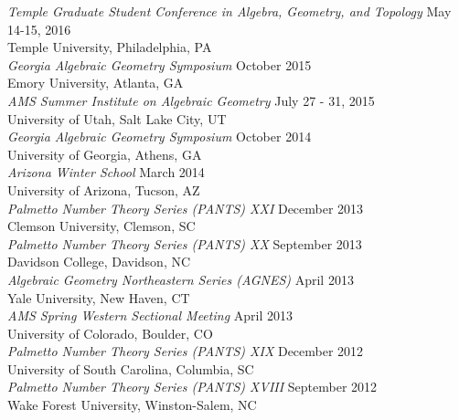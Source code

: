 \documentclass{article}
\begin{document}
  \noindent\textsl{Temple Graduate Student Conference in Algebra, Geometry, and Topology} \hfill May 14-15, 2016\\
  Temple University, Philadelphia, PA\\
  
  \noindent\textsl{Georgia Algebraic Geometry Symposium} \hfill October 2015\\
  Emory University, Atlanta, GA\\

  \noindent\textsl{AMS Summer Institute on Algebraic Geometry} \hfill July 27 - 31, 2015\\
  University of Utah, Salt Lake City, UT\\

  \noindent\textsl{Georgia Algebraic Geometry Symposium} \hfill October 2014\\
  University of Georgia, Athens, GA\\

  \noindent\textsl{Arizona Winter School} \hfill March 2014\\
  University of Arizona, Tucson, AZ\\

  \noindent\textsl{Palmetto Number Theory Series (PANTS) XXI} \hfill December 2013\\
  Clemson University, Clemson, SC\\

  \noindent\textsl{Palmetto Number Theory Series (PANTS) XX} \hfill September 2013\\
  Davidson College, Davidson, NC\\
  
  \noindent\textsl{Algebraic Geometry Northeastern Series (AGNES)} \hfill April 2013\\
  Yale University, New Haven, CT\\

  \noindent\textsl{AMS Spring Western Sectional Meeting} \hfill April 2013\\
  University of Colorado, Boulder, CO\\

  \noindent\textsl{Palmetto Number Theory Series (PANTS) XIX} \hfill December 2012\\
  University of South Carolina, Columbia, SC\\

  \noindent\textsl{Palmetto Number Theory Series (PANTS) XVIII} \hfill September 2012\\
  Wake Forest University, Winston-Salem, NC\\
\end{document}
